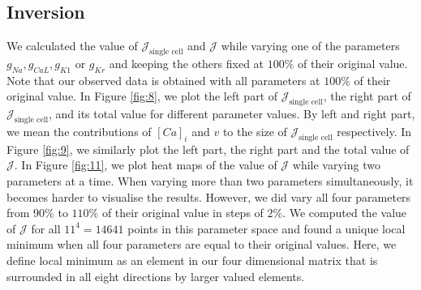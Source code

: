 \documentclass{article}
\begin{document}
\subsection{Inversion} \label{Inversion}
We calculated the value of $\mathcal{J}_{\text{single cell}}$ and $\mathcal{J}$ while varying one of the parameters $g_{Na}, g_{CaL}, g_{K1}$ or $g_{Kr}$ and keeping the others fixed at $100\%$ of their original value. Note that our observed data is obtained with all parameters at $100\%$ of their original value. In Figure \ref{fig:8}, we plot the left part of $\mathcal{J}_{\text{single cell}}$, the right part of $\mathcal{J}_{\text{single cell}}$, and its total value for different parameter values. By left and right part, we mean the contributions of $[Ca]_i$ and $v$ to the size of $\mathcal{J}_{\text{single cell}}$ respectively. In Figure \ref{fig:9}, we similarly plot the left part, the right part and the total value of $\mathcal{J}$. In Figure \ref{fig:11}, we plot heat maps of the value of $\mathcal{J}$ while varying two parameters at a time. When varying more than two parameters simultaneously, it becomes harder to visualise the results. However, we did vary all four parameters from $90\%$ to $110\%$ of their original value in steps of $2\%$. We computed the value of $\mathcal{J}$ for all $11^4=14641$ points in this parameter space and found a unique local minimum when all four parameters are equal to their original values. Here, we define local minimum as an element in our four dimensional matrix that is surrounded in all eight directions by larger valued elements.
\end{document}
